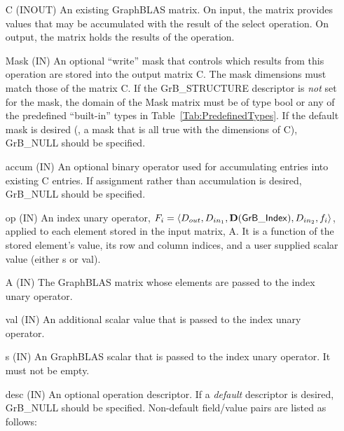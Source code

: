 \begin{itemize}[leftmargin=1.1in]
    \item[{\sf C}]    ({\sf INOUT}) An existing GraphBLAS matrix. On input,
    the matrix provides values that may be accumulated with the result of the
    select operation.  On output, the matrix holds the results of the
    operation.

    \item[{\sf Mask}] ({\sf IN}) An optional ``write'' mask that controls which
    results from this operation are stored into the output matrix {\sf C}. The 
    mask dimensions must match those of the matrix {\sf C}. If the 
    {\sf GrB\_STRUCTURE} descriptor is {\em not} set for the mask, the domain of the 
    {\sf Mask} matrix must be of type {\sf bool} or any of the predefined 
    ``built-in'' types in Table~\ref{Tab:PredefinedTypes}.  If the default
    mask is desired (\ie, a mask that is all {\sf true} with the dimensions of {\sf C}), 
    {\sf GrB\_NULL} should be specified.

    \item[{\sf accum}] ({\sf IN}) An optional binary operator used for accumulating
    entries into existing {\sf C} entries. If assignment rather than accumulation is
    desired, {\sf GrB\_NULL} should be specified.

   \item[{\sf op}] ({\sf IN}) An index unary operator, 
    $F_i = \langle \mbox{$D_{out}$}, \mbox{$D_{in_{1}}$}, \mathbf{D}({\sf GrB\_Index}), \mbox{$D_{in_{2}}$}, f_{i} \rangle$, 
    applied to each element stored in the input matrix, {\sf A}. It is a function 
    of the stored element's value, its row and column indices,
    and a user supplied scalar value (either {\sf s} or {\sf val}).

    \item[{\sf A}] ({\sf IN}) The GraphBLAS matrix whose elements are passed 
    to the index unary operator.

    \item[{\sf val}] ({\sf IN}) An additional scalar value that is passed to the 
    index unary operator.

    \item[{\sf s}] ({\sf IN}) An GraphBLAS scalar that is passed to the 
    index unary operator.  It must not be empty.

    \item[{\sf desc}] ({\sf IN}) An optional operation descriptor. If
    a \emph{default} descriptor is desired, {\sf GrB\_NULL} should be
    specified. Non-default field/value pairs are listed as follows:  \\


\end{itemize}
